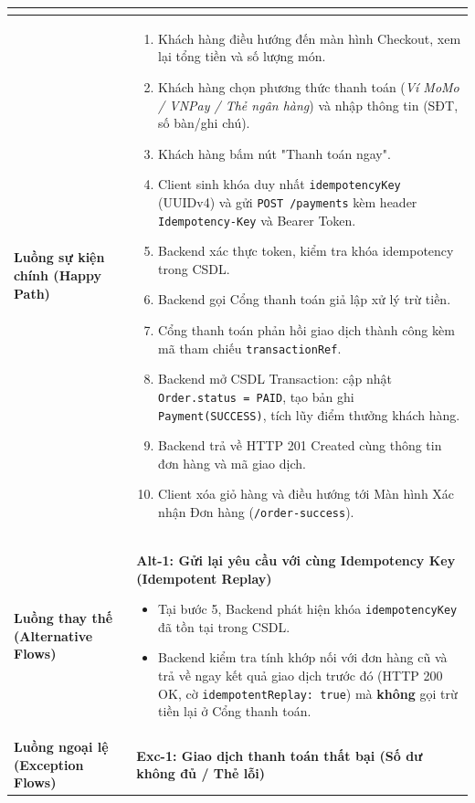 \documentclass[a4paper]{article}
\begin{document}
\begin{table}[h!]
\begin{tabular}{|p{3.5cm}|p{11.5cm}|}
\begin{enumerate}
    \vspace{-0.2cm}
\end{enumerate} \\ \hline
\textbf{Luồng sự kiện chính (Happy Path)} & 
\begin{enumerate}
    \vspace{-0.2cm}
    \item Khách hàng điều hướng đến màn hình Checkout, xem lại tổng tiền và số lượng món.
    \item Khách hàng chọn phương thức thanh toán (\textit{Ví MoMo / VNPay / Thẻ ngân hàng}) và nhập thông tin (SĐT, số bàn/ghi chú).
    \item Khách hàng bấm nút "Thanh toán ngay".
    \item Client sinh khóa duy nhất \texttt{idempotencyKey} (UUIDv4) và gửi \texttt{POST /payments} kèm header \texttt{Idempotency-Key} và Bearer Token.
    \item Backend xác thực token, kiểm tra khóa idempotency trong CSDL.
    \item Backend gọi Cổng thanh toán giả lập xử lý trừ tiền.
    \item Cổng thanh toán phản hồi giao dịch thành công kèm mã tham chiếu \texttt{transactionRef}.
    \item Backend mở CSDL Transaction: cập nhật \texttt{Order.status = PAID}, tạo bản ghi \texttt{Payment(SUCCESS)}, tích lũy điểm thưởng khách hàng.
    \item Backend trả về HTTP 201 Created cùng thông tin đơn hàng và mã giao dịch.
    \item Client xóa giỏ hàng và điều hướng tới Màn hình Xác nhận Đơn hàng (\texttt{/order-success}).
    \vspace{-0.2cm}
\end{enumerate} \\ \hline
\textbf{Luồng thay thế (Alternative Flows)} & 
\textbf{Alt-1: Gửi lại yêu cầu với cùng Idempotency Key (Idempotent Replay)}
\begin{itemize}
    \item Tại bước 5, Backend phát hiện khóa \texttt{idempotencyKey} đã tồn tại trong CSDL.
    \item Backend kiểm tra tính khớp nối với đơn hàng cũ và trả về ngay kết quả giao dịch trước đó (HTTP 200 OK, cờ \texttt{idempotentReplay: true}) mà \textbf{không} gọi trừ tiền lại ở Cổng thanh toán.
\end{itemize} \\ \hline
\textbf{Luồng ngoại lệ (Exception Flows)} & 
\textbf{Exc-1: Giao dịch thanh toán thất bại (Số dư không đủ / Thẻ lỗi)}

\end{tabular}
\end{table}
\end{document}

